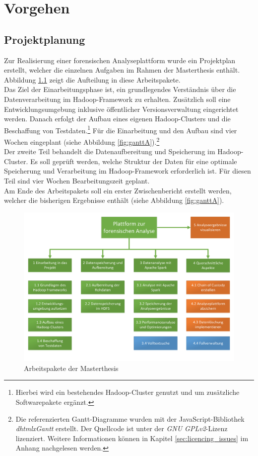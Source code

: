 \chapter{Vorgehen}
\label{ch:development_approach}

\section{Projektplanung}
\label{sec:project_plan}
Zur Realisierung einer forensischen Analyseplattform wurde ein Projektplan erstellt, welcher die einzelnen Aufgaben im Rahmen der Masterthesis enthält. Abbildung \ref{fig:workpackages} zeigt die Aufteilung in diese Arbeitspakete.\\
Das Ziel der Einarbeitungsphase ist, ein grundlegendes Verständnis über die Datenverarbeitung im Hadoop-Framework zu erhalten. Zusätzlich soll eine Entwicklungsumgebung inklusive öffentlicher Versionsverwaltung eingerichtet werden. Danach erfolgt der Aufbau eines eigenen Hadoop-Clusters und die Beschaffung von Testdaten.\footnote{Hierbei wird ein bestehendes Hadoop-Cluster genutzt und um zusätzliche Softwarepakete ergänzt.} Für die Einarbeitung und den Aufbau sind vier Wochen eingeplant (siehe Abbildung \ref{fig:ganttA}).\footnote{Die referenzierten Gantt-Diagramme wurden mit der JavaScript-Bibliothek \textit{dhtmlxGantt} erstellt. Der Quellcode ist unter der \textit{GNU GPLv2}-Lizenz lizenziert. Weitere Informationen können in Kapitel \ref{sec:licencing_issues} im Anhang nachgelesen werden.}\\

\noindent
Der zweite Teil behandelt die Datenaufbereitung und Speicherung im Hadoop-Cluster. Es soll geprüft werden, welche Struktur der Daten für eine optimale Speicherung und Verarbeitung im Hadoop-Framework erforderlich ist. Für diesen Teil sind vier Wochen Bearbeitungszeit geplant.\\
Am Ende des Arbeitspakets soll ein erster Zwischenbericht erstellt werden, welcher die bisherigen Ergebnisse enthält (siehe Abbildung \ref{fig:ganttA}).\\

\begin{figure}[ht]
  \centering
  \includegraphics[width=\textwidth]{./resource/Arbeitspakete.pdf}
  \caption{Arbeitspakete der Masterthesis}
  \label{fig:workpackages}
\end{figure}

